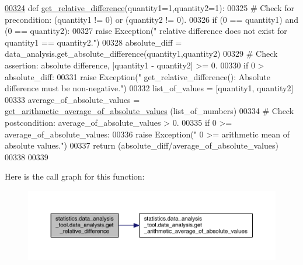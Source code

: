 \begin{DoxyCode}
\hypertarget{classstatistics_1_1data__analysis__tool_1_1data__analysis_l00324}{}\hyperlink{classstatistics_1_1data__analysis__tool_1_1data__analysis_a04973a814dd603d6603da8c4d21ea1d8}{00324}     \textcolor{keyword}{def }\hyperlink{classstatistics_1_1data__analysis__tool_1_1data__analysis_a04973a814dd603d6603da8c4d21ea1d8}{get\_relative\_difference}(quantity1=1,quantity2=1):
00325         \textcolor{comment}{# Check for precondition: (quantity1 != 0) or (quantity2 != 0).}
00326         \textcolor{keywordflow}{if} (0 == quantity1) \textcolor{keywordflow}{and} (0 == quantity2):
00327             \textcolor{keywordflow}{raise} Exception(\textcolor{stringliteral}{"   relative difference does not exist for quantity1 == quantity2."})
00328         absolute\_diff = data\_analysis.get\_absolute\_difference(quantity1,quantity2)
00329         \textcolor{comment}{# Check assertion: absolute difference, |quantity1 - quantity2| >= 0.}
00330         \textcolor{keywordflow}{if} 0 > absolute\_diff:
00331             \textcolor{keywordflow}{raise} Exception(\textcolor{stringliteral}{"   get\_relative\_difference(): Absolute difference must be non-negative."})
00332         list\_of\_values = [quantity1, quantity2]
00333         average\_of\_absolute\_values = \hyperlink{classstatistics_1_1data__analysis__tool_1_1data__analysis_a3eb98f0cd57564ad42dd8b2cef5feab5}{get\_arithmetic\_average\_of\_absolute\_values}
      (list\_of\_numbers)
00334         \textcolor{comment}{# Check postcondition: average\_of\_absolute\_values > 0.}
00335         \textcolor{keywordflow}{if} 0 >= average\_of\_absolute\_values:
00336             \textcolor{keywordflow}{raise} Exception(\textcolor{stringliteral}{"   0 >= arithmetic mean of absolute values."})
00337         \textcolor{keywordflow}{return} (absolute\_diff/average\_of\_absolute\_values)
00338     
00339 \end{DoxyCode}


Here is the call graph for this function\+:
\nopagebreak
\begin{figure}[H]
\begin{center}
\leavevmode
\includegraphics[width=350pt]{d8/dd7/classstatistics_1_1data__analysis__tool_1_1data__analysis_a04973a814dd603d6603da8c4d21ea1d8_cgraph}
\end{center}
\end{figure}


